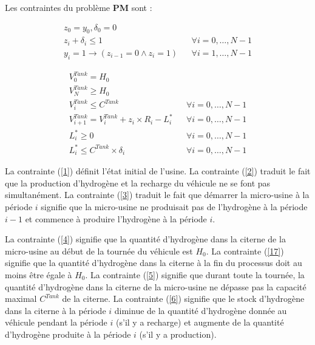 Les contraintes du problème \textbf{PM} sont :

\begin{subequations}
	\begin{align}
	\label{1}	z_{0}= y_0, \delta_0=0&  & \\
	\label{2}	z_i+\delta_i\leq 1&  &\forall i= 0, \dots, N-1 \\
	\label{3}	y_i=1 \rightarrow (z_{i-1}=0 \land z_i=1)&  &\forall i= 1, \dots, N-1
	\end{align}
\end{subequations}

\begin{subequations}
	\label{usine_stock}
	\begin{align}
	\label{4}	V^{Tank}_{0}= H_0&  & \\
	\label{17}	V_{N}^{Tank}\geq H_{0}&  & \\
	\label{5}	V^{Tank}_{i}\leq C^{Tank}&  &\forall i= 0, \dots, N-1 \\
	\label{6}	V^{Tank}_{i+1}= V^{Tank}_{i}+z_i\times R_i -  L^*_i&  &\forall i= 0, \dots, N-1 \\
	\label{203} L^*_i \geq 0 & & \forall i= 0, \dots, N-1 \\
	\label{204} L^*_i \leq  C^{Tank} \times \delta_i  & & \forall i= 0, \dots, N-1
	\end{align}
\end{subequations}

La contrainte (\ref{1}) définit l'état initial de l'usine.
La contrainte (\ref{2}) traduit le fait que la production d'hydrogène et la recharge du véhicule ne se font pas simultanément. La contrainte (\ref{3}) traduit le fait que démarrer la micro-usine à la période $i$ signifie que la micro-usine ne produisait pas de l'hydrogène à la période $i-1$ et commence à produire l'hydrogène à la période $i$.

La contrainte (\ref{4}) signifie que la quantité d'hydrogène dans la citerne de la micro-usine au début de la tournée du véhicule est $H_0$. La contrainte (\ref{17}) signifie que la quantité d'hydrogène dans la citerne à la fin du processus doit au moins être égale à $H_0$. La contrainte (\ref{5}) signifie que durant toute la tournée, la quantité d'hydrogène dans la citerne de la micro-usine ne dépasse pas la capacité
maximal $C^{Tank}$ de la citerne. La contrainte (\ref{6}) signifie que le stock d'hydrogène dans la citerne à la période $i$  diminue de la quantité d'hydrogène donnée au véhicule pendant la période $i$ (s'il y a recharge) et augmente de la quantité d'hydrogène produite à la période $i$ (s'il y a production).

